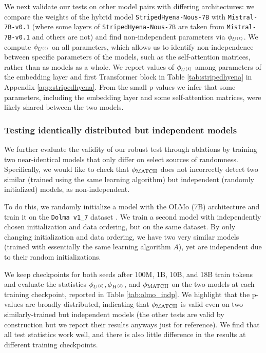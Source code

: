 We next validate our tests on other model pairs with differing architectures: we compare the weights of the hybrid model \texttt{StripedHyena-Nous-7B} \citep{stripedhyena} with \texttt{Mistral-7B-v0.1} (where some layers of \texttt{StripedHyena-Nous-7B} are taken from \texttt{Mistral-7B-v0.1} and others are not) and find non-independent parameters via $\phi_{U^{(\ell)}}$. We compute $\phi_{U^{(\ell)}}$ on all parameters, which allows us to identify non-independence between specific parameters of the models, such as the self-attention matrices, rather than as models as a whole. We report values of $\phi_{U^{(\ell)}}$ among parameters of the embedding layer and first Transformer block in Table \ref{tab:stripedhyena} in Appendix \ref{app:stripedhyena}. From the small p-values we infer that some parameters, including the embedding layer and some self-attention matrices, were likely shared between the two models. 

\subsubsection{Testing identically distributed but independent models}
\label{sec:independent-similar-models}

We further evaluate the validity of our robust test through ablations by training two near-identical models that only differ on select sources of randomness. Specifically, we would like to check that $\phi_{\textup{MATCH}}$ does not incorrectly detect two similar (trained using the same learning algorithm) but independent (randomly initialized) models, as non-independent. 

To do this, we randomly initialize a model with the OLMo (7B) architecture \citep{groeneveld2024olmoacceleratingsciencelanguage} and train it on the \texttt{Dolma v1\_7} dataset \citep{soldaini2024dolmaopencorpustrillion}. We train a second model with independently chosen initialization and data ordering, but on the same dataset.
By only changing initialization and data ordering, we have two very similar models (trained with essentially the same learning algorithm $A$), yet are independent due to their random initializations. 

We keep checkpoints for both seeds after 100M, 1B, 10B, and 18B train tokens and evaluate the statistics $\phi_{U^{(\ell)}}, \phi_{H^{(\ell)}}$, and $\phi_{\textup{MATCH}}$ on the two models at each training checkpoint, reported in Table \ref{tab:olmo_indp}. We highlight that the p-values are broadly distributed, indicating that $\phi_{\textup{MATCH}}$ is valid even on two similarly-trained but independent models (the other tests are valid by construction but we report their results anyways just for reference).
We find that all test statistics work well, and there is also little difference in the results at different training checkpoints.

